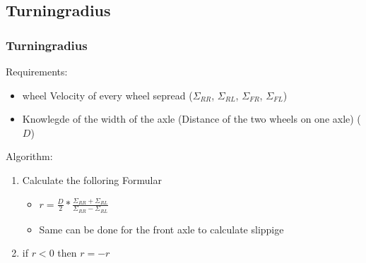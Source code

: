 \documentclass{beamer}
\begin{document}
\subsection{Turningradius}

\begin{frame}
    \frametitle{Turningradius}
    Requirements:
    \begin{itemize}
     \item wheel Velocity of every wheel sepread ($\Sigma_{RR}$, $\Sigma_{RL}$, $\Sigma_{FR}$, $\Sigma_{FL}$)
     \item Knowlegde of the width of the axle (Distance of the two wheels on one axle) ($D$)
    \end{itemize}
    Algorithm:
    \begin{enumerate}
     \item Calculate the folloring Formular
     \begin{itemize}
        \item $r=\frac{D}{2}*\frac{\Sigma_{RR}+\Sigma_{RL}}{\Sigma_{RR}-\Sigma_{RL}}$
        \item Same can be done for the front axle to calculate slippige
     \end{itemize}
     \item if $r<0$ then $r=-r$
    \end{enumerate}
\end{frame}
\end{document}
